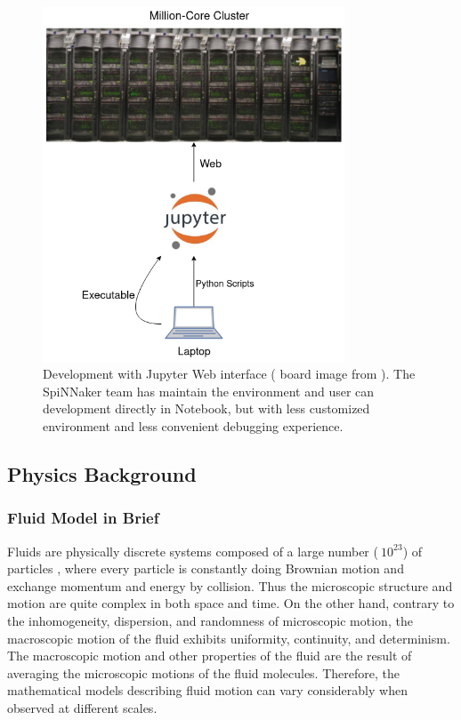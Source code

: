 \begin{figure}[!tb]
\centering
    \centering
   \includegraphics[width=0.8\textwidth]{figures/jupyter.png}
       \caption{Development with Jupyter Web interface ( board image from \cite{spinn-core}). The SpiNNaker team has maintain the environment and user can development directly in Notebook, but with less customized environment and less convenient debugging experience.}
       \label{fig:jupyter}
\end{figure}


\subsection{Physics Background} \label{sec:PB}

\subsubsection{Fluid Model in Brief}
Fluids are physically discrete systems composed of a large number ($~10^{23}$) of particles \cite{lbmmbook}, where every particle is constantly doing Brownian motion and exchange momentum and energy by collision. Thus the microscopic structure and motion are quite complex in both space and time. On the other hand, contrary to the inhomogeneity, dispersion, and randomness of microscopic motion, the macroscopic motion of the fluid exhibits uniformity, continuity, and determinism. The macroscopic motion and other properties of the fluid are the result of averaging the microscopic motions of the fluid molecules. Therefore, the mathematical models describing fluid motion can vary considerably when observed at different scales.\\

